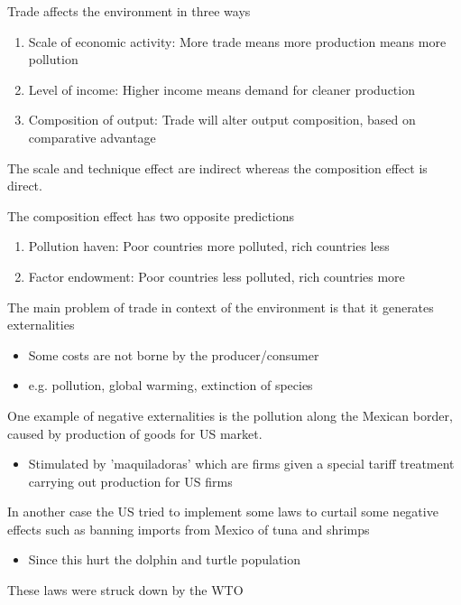 \documentclass{beamer}
\begin{document}
\begin{frame}
 Trade affects the environment in three ways
 \begin{enumerate}
   \item Scale of economic activity: More trade means more production means more pollution
   \item Level of income: Higher income means demand for cleaner production
   \medskip
   \item Composition of output: Trade will alter output composition, based on comparative advantage
 \end{enumerate}
 \medskip
 The scale and technique effect are indirect whereas the composition effect is direct.
\end{frame}

\begin{frame}
  The composition effect has two opposite predictions
  \begin{enumerate}
    \item Pollution haven: Poor countries more polluted, rich countries less
    \item Factor endowment: Poor countries less polluted, rich countries more
  \end{enumerate}
\end{frame}

\begin{frame}
  The main problem of trade in context of the environment is that it generates externalities
  \begin{itemize}
    \item Some costs are not borne by the producer/consumer
    \item e.g. pollution, global warming, extinction of species
  \end{itemize}
\end{frame}

\begin{frame}
  One example of negative externalities is the pollution along the Mexican border, caused by production of goods for US market.
  \begin{itemize}
    \item Stimulated by 'maquiladoras' which are firms given a special tariff treatment carrying out production for US firms
  \end{itemize}
  \medskip
  In another case the US tried to implement some laws to curtail some negative effects such as banning imports from Mexico of tuna and shrimps
  \begin{itemize}
    \item Since this hurt the dolphin and turtle population
  \end{itemize}
  \medskip
  These laws were struck down by the WTO
\end{frame}
\end{document}
